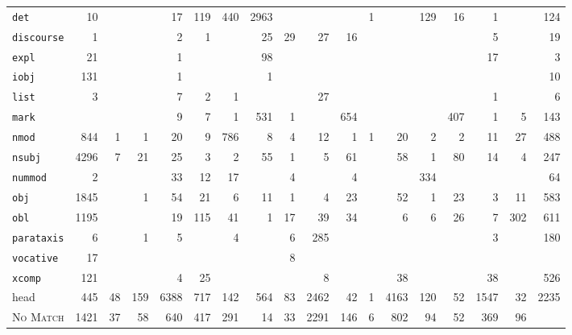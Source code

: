 \documentclass[t,xcolor={svgnames,table}]{beamer}
\begin{document}
\begin{frame}
{\begin{tabular}{lRRRRRRRRRRRRRRRR|R}
\texttt{det} & 10 &  &  & 17 & 119 & 440 & 2963 &  &  &  & 1 &  & 129 & 16 & 1 &  & 124 \\
\texttt{discourse} & 1 &  &  & 2 & 1 &  & 25 & 29 & 27 & 16 &  &  &  &  & 5 &  & 19 \\
\texttt{expl} & 21 &  &  & 1 &  &  & 98 &  &  &  &  &  &  &  & 17 &  & 3 \\
\texttt{iobj} & 131 &  &  & 1 &  &  & 1 &  &  &  &  &  &  &  &  &  & 10 \\
\texttt{list} & 3 &  &  & 7 & 2 & 1 &  &  & 27 &  &  &  &  &  & 1 &  & 6 \\
\texttt{mark} &  &  &  & 9 & 7 & 1 & 531 & 1 &  & 654 &  &  &  & 407 & 1 & 5 & 143 \\
\texttt{nmod} & 844 & 1 & 1 & 20 & 9 & 786 & 8 & 4 & 12 & 1 & 1 & 20 & 2 & 2 & 11 & 27 & 488 \\
\texttt{nsubj} & 4296 & 7 & 21 & 25 & 3 & 2 & 55 & 1 & 5 & 61 &  & 58 & 1 & 80 & 14 & 4 & 247 \\
\texttt{nummod} & 2 &  &  & 33 & 12 & 17 &  & 4 &  & 4 &  &  & 334 &  &  &  & 64 \\
\texttt{obj} & 1845 &  & 1 & 54 & 21 & 6 & 11 & 1 & 4 & 23 &  & 52 & 1 & 23 & 3 & 11 & 583 \\
\texttt{obl} & 1195 &  &  & 19 & 115 & 41 & 1 & 17 & 39 & 34 &  & 6 & 6 & 26 & 7 & 302 & 611 \\
\texttt{parataxis} & 6 &  & 1 & 5 &  & 4 &  & 6 & 285 &  &  &  &  &  & 3 &  & 180 \\
\texttt{vocative} & 17 &  &  &  &  &  &  & 8 &  &  &  &  &  &  &  &  &  \\
\texttt{xcomp} & 121 &  &  & 4 & 25 &  &  &  & 8 &  &  & 38 &  &  & 38 &  & 526 \\
\hline
head & 445 & 48 & 159 & 6388 & 717 & 142 & 564 & 83 & 2462 & 42 & 1 & 4163 & 120 & 52 & 1547 & 32 & 2235 \\
\hline
\textsc{No Match} & 1421 & 37 & 58 & 640 & 417 & 291 & 14 & 33 & 2291 & 146 & 6 & 802 & 94 & 52 & 369 & 96 & 
\end{tabular}
}
\end{frame}

\finegrained
\pgfplotstabletranspose[colnames from=colnames]\finegrainedtranspose{\finegrained}
\end{document}
